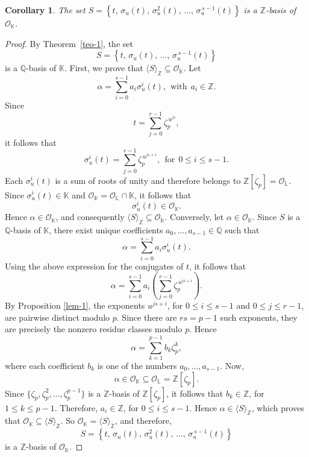 \documentclass[10pt,a4paper]{amsart}
\newtheorem{corollary}[theorem]{Corollary}
\begin{document}
\begin{corollary} \label{cor-1} The set $S=\left\{t,\,\sigma_u(t),\,\sigma_u^{2}(t),\,\ldots,\,\sigma_u^{\,s-1}(t)\right\}$ is a $\mathbb{Z}$-basis of $\mathcal{O}_{\mathbb{K}}$. \end{corollary}
\begin{proof} By Theorem~\ref{teo-1}, the set \[ S = \left\{ t,\,\sigma_u(t),\,\ldots,\,\sigma_u^{\,s-1}(t)\right\} \] is a $\mathbb{Q}$-basis of $\mathbb{K}$.
First, we prove that $\langle S\rangle_{\mathbb{Z}}\subseteq\mathcal{O}_{\mathbb{K}}$. Let \[ \alpha = \sum_{i=0}^{s-1}a_i\sigma_u^i(t), \ \ \mbox{with} \ \  a_i\in\mathbb{Z}. \]
Since \[ t = \sum_{j=0}^{r-1} \zeta_p^{\,u^{js}}, \] it follows that \[ \sigma_u^i(t) = \sum_{j=0}^{r-1} \zeta_p^{\,u^{js+i}}, \ \ \mbox{for} \ \ 0\le i\le s-1. \]
Each $\sigma_u^i(t)$ is a sum of roots of unity and therefore belongs to
$\mathbb{Z}[\zeta_p]=\mathcal{O}_{\mathbb{L}}$. Since $\sigma_u^i(t)\in\mathbb{K}$ and $\mathcal{O}_{\mathbb{K}} = \mathcal{O}_{\mathbb{L}}\cap\mathbb{K}$, it follows that
\[ \sigma_u^i(t)\in\mathcal{O}_{\mathbb{K}}. \] Hence $\alpha\in\mathcal{O}_{\mathbb{K}}$, and consequently $\langle S\rangle_{\mathbb{Z}} \subseteq \mathcal{O}_{\mathbb{K}}$.
Conversely, let $\alpha\in\mathcal{O}_{\mathbb{K}}$. Since $S$ is a $\mathbb{Q}$-basis of $\mathbb{K}$, there exist unique
coefficients $a_0,\ldots,a_{s-1}\in\mathbb{Q}$ such that \[ \alpha = \sum_{i=0}^{s-1} a_i\sigma_u^i(t). \] Using the above expression for the conjugates of $t$, it follows that 
\[ \alpha = \sum_{i=0}^{s-1} a_i \left( \sum_{j=0}^{r-1} \zeta_p^{\,u^{js+i}} \right). \] By Proposition \ref{lem-1}, the exponents $u^{js+i}$, for $0\le i\le s-1$ and $0\le j\le r-1$,
are pairwise distinct modulo $p$. Since there are $rs=p-1$ such exponents, they are precisely the nonzero residue classes modulo $p$. Hence
\[ \alpha = \sum_{k=1}^{p-1} b_k\zeta_p^k, \] where each coefficient $b_k$ is one of the numbers $a_0,\ldots,a_{s-1}$. Now, \[
\alpha\in\mathcal{O}_{\mathbb{K}} \subseteq \mathcal{O}_{\mathbb{L}} = \mathbb{Z}[\zeta_p]. \] Since $\{\zeta_p,\zeta_p^2,\ldots,\zeta_p^{p-1}\}$ is a $\mathbb{Z}$-basis of $\mathbb{Z}[\zeta_p]$, it follows that $b_k\in\mathbb{Z}$, for $1\le k\le p-1$. 
Therefore, $a_i\in\mathbb{Z}$, for $0\le i\le s-1$. Hence $\alpha\in\langle S\rangle_{\mathbb{Z}}$,  which proves that $\mathcal{O}_{\mathbb{K}} \subseteq\langle S\rangle_{\mathbb{Z}}$.
So $\mathcal{O}_{\mathbb{K}} = \langle S\rangle_{\mathbb{Z}}$, and therefore, \[ S= \left\{t,\,\sigma_u(t),\,\sigma_u^{2}(t),\, \ldots,\,\sigma_u^{\,s-1}(t) \right\} \] is a $\mathbb{Z}$-basis of $\mathcal{O}_{\mathbb{K}}$.
\end{proof}
\end{document}
